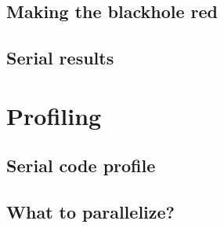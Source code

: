 \documentclass{article}
\begin{document}
\subsection{Making the blackhole red}
\subsection{Serial results}


\section{Profiling}
\subsection{Serial code profile}
\subsection{What to parallelize?}
\end{document}
